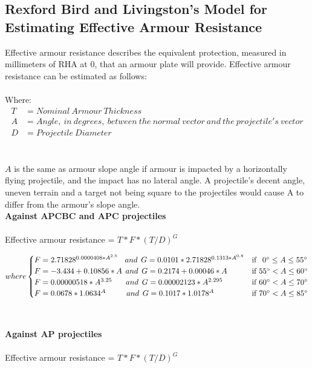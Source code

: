 \documentclass[]{article}
\begin{document}
\subsection{Rexford Bird and Livingston's Model for Estimating Effective Armour Resistance}
Effective armour resistance describes the equivalent protection, measured in millimeters of RHA at 0\degree, that an armour plate will provide. Effective armour resistance can be estimated as follows:
\\\\
Where:
\begin{align*}
T &= Nominal\:Armour\:Thickness\\
A &= Angle,\:in\:degrees,\:between\:the\:normal\:vector\:and\:the\:projectile's\:vector\\
D &= Projectile\:Diameter
\end{align*}
\\\\
\noindent $A$ is the same as armour slope angle if armour is impacted by a horizontally flying projectile, and the impact has no lateral angle. A projectile's decent angle, uneven terrain and a target not being square to the projectiles would cause A to differ from the armour's slope angle. \\

\noindent \textbf{Against APCBC and APC projectiles}
\\\\
Effective armour resistance = $T*F*(T/D)^G$

\[
where
\begin{cases}

F=2.71828^{0.0000408*A^{2.5}}\:\:\:\:and\:\:G=0.0101*2.71828^{0.1313*A^{0.8}} & \text{if \:\:$0\degree \leq A\leq55\degree$} \\
F=-3.434+0.10856*A\:\:and\:\:G=0.2174 + 0.00046*A & \text{if $55\degree<A\leq60\degree$} \\
F=0.00000518*A^{3.25}\:\:\:\:\:\:\:\:and\:\:G=0.00002123*A^{2.295} & \text{if $60\degree<A\leq70\degree$} \\
F=0.0678*1.0634^A\:\:\:\:\:\:\:\:\:\:\:\:and\:\:G=0.1017*1.0178^A & \text{if $70\degree<A\leq85\degree$}

\end{cases}
\]
\\\\
\noindent \textbf{Against AP projectiles}
\\\\
Effective armour resistance = $T*F*(T/D)^G$
\end{document}
